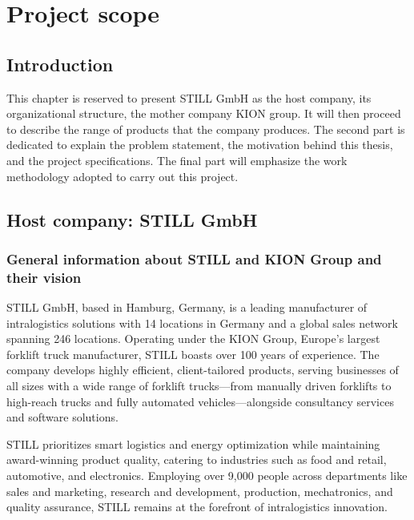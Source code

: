 \chapter{Project scope}

\renewcommand{\chaptername}{Chapter}

\section*{Introduction}

This chapter is reserved to present STILL GmbH as the host company, its organizational structure, the mother 
company KION group. It will then proceed to describe the range of products that the company produces.
The second part is dedicated to explain the problem statement, the motivation behind this thesis, and the project specifications.
The final part will emphasize the work methodology adopted to carry out this project.

\begin{sloppypar}
\section{Host company: STILL GmbH}
\end{sloppypar}


\subsection{General information about STILL and KION Group and their vision}

STILL GmbH, based in Hamburg, Germany, is a leading manufacturer of intralogistics solutions with 14 locations 
in Germany and a global sales network spanning 246 locations. 
Operating under the KION Group, Europe’s largest forklift truck manufacturer, STILL boasts over 100 years of 
experience. The company develops highly efficient, client-tailored products, serving businesses of all sizes 
with a wide range of forklift trucks—from manually driven forklifts to high-reach trucks and fully automated 
vehicles—alongside consultancy services and software solutions. 

STILL prioritizes smart logistics and energy optimization while maintaining award-winning product quality, 
catering to industries such as food and retail, automotive, and electronics. Employing over 9,000 people across 
departments like sales and marketing, research and development, production, mechatronics, and quality assurance, 
STILL remains at the forefront of intralogistics innovation. 

